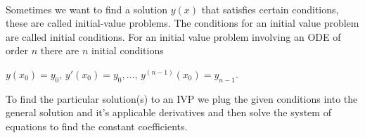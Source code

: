 \documentclass{report}
\begin{document}
        \paragraph{}Sometimes we want to find a solution \(y(x)\) that satisfies certain conditions, these are called 
        initial-value problems. The conditions for an initial value problem are called initial conditions. 
        For an initial value problem involving an ODE of order \(n\) there are \(n\) initial conditions
        \begin{center}
            \(y(x_0)=y_0,\, y'(x_0) = y_0, . . . ,\, y^{(n-1)}(x_0)=y_{n-1}\).
        \end{center}
        To find the particular solution(s) to an IVP we plug the given conditions into the general solution and 
        it's applicable derivatives and then solve the system of equations to find the constant coefficients.
\end{document}
